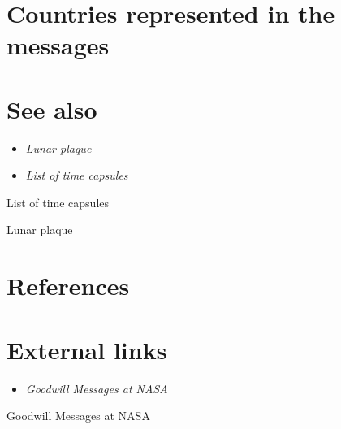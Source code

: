 \section{Countries represented in the
messages}\label{countries-represented-in-the-messages}

\section{See also}\label{see-also}

\begin{itemize}
\item
  \emph{Lunar plaque}
\item
  \emph{List of time capsules}
\end{itemize}

List of time capsules

Lunar plaque

\section{References}\label{references}

\section{External links}\label{external-links}

\begin{itemize}
\item
  \emph{Goodwill Messages at NASA}
\end{itemize}

Goodwill Messages at NASA
